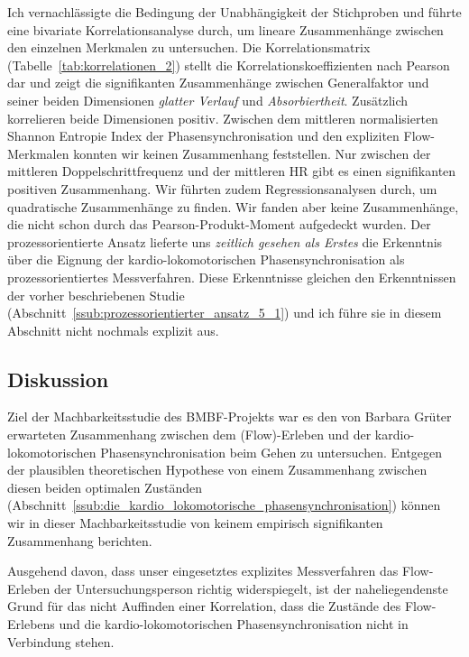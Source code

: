 Ich vernachlässigte die Bedingung der Unabhängigkeit der Stichproben und führte eine bivariate Korrelationsanalyse durch, um lineare Zusammenhänge zwischen den einzelnen Merkmalen zu untersuchen. Die Korrelationsmatrix (Tabelle~\ref{tab:korrelationen_2}) stellt die Korrelationskoeffizienten nach Pearson dar und zeigt die signifikanten Zusammenhänge zwischen Generalfaktor und seiner beiden Dimensionen \emph{glatter Verlauf} und \emph{Absorbiertheit}. Zusätzlich korrelieren beide Dimensionen positiv. Zwischen dem mittleren normalisierten Shannon Entropie Index der Phasensynchronisation und den expliziten Flow-Merkmalen konnten wir keinen Zusammenhang feststellen. Nur zwischen der mittleren Doppelschrittfrequenz und der mittleren \ac{HR} gibt es einen signifikanten positiven Zusammenhang. Wir führten zudem Regressionsanalysen durch, um quadratische Zusammenhänge zu finden. Wir fanden aber keine Zusammenhänge, die nicht schon durch das Pearson-Produkt-Moment aufgedeckt wurden. Der prozessorientierte Ansatz lieferte uns \emph{zeitlich gesehen als Erstes} die Erkenntnis über die Eignung der kardio-lokomotorischen Phasensynchronisation als prozessorientiertes Messverfahren. Diese Erkenntnisse gleichen den Erkenntnissen der vorher beschriebenen Studie (Abschnitt~\ref{ssub:prozessorientierter_ansatz_5_1}) und ich führe sie in diesem Abschnitt nicht nochmals explizit aus.

\subsection{Diskussion} 

\label{sub:diskussion_5_2}

Ziel der Machbarkeitsstudie des \acs{BMBF}-Projekts war es den von Barbara Grüter erwarteten Zusammenhang zwischen dem (Flow)-Erleben und der kardio-lokomotorischen Phasensynchronisation beim Gehen zu untersuchen. Entgegen der plausiblen theoretischen Hypothese von einem Zusammenhang zwischen diesen beiden optimalen Zuständen (Abschnitt~\ref{ssub:die_kardio_lokomotorische_phasensynchronisation}) können wir in dieser Machbarkeitsstudie von keinem empirisch signifikanten Zusammenhang berichten.

Ausgehend davon, dass unser eingesetztes explizites Messverfahren das Flow-Erleben der Untersuchungsperson richtig widerspiegelt, ist der naheliegendenste Grund für das nicht Auffinden einer Korrelation, dass die Zustände des Flow-Erlebens und die kardio-lokomotorischen Phasensynchronisation nicht in Verbindung stehen.

